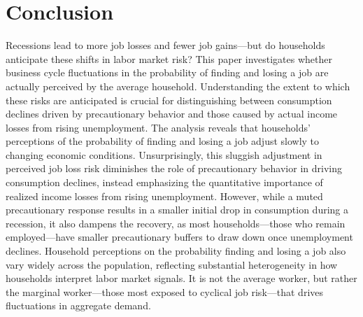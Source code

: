 
\section{Conclusion}

Recessions lead to more job losses and fewer job gains—but do households anticipate these shifts in labor market risk? This paper investigates whether business cycle fluctuations in the probability of finding and losing a job are actually perceived by the average household. Understanding the extent to which these risks are anticipated is crucial for distinguishing between consumption declines driven by precautionary behavior and those caused by actual income losses from rising unemployment. The analysis reveals that households’ perceptions of the probability of finding and losing a job adjust slowly to changing economic conditions. Unsurprisingly, this sluggish adjustment in perceived job loss risk diminishes the role of precautionary behavior in driving consumption declines, instead emphasizing the quantitative importance of realized income losses from rising unemployment. However, while a muted precautionary response results in a smaller initial drop in consumption during a recession, it also dampens the recovery, as most households—those who remain employed—have smaller precautionary buffers to draw down once unemployment declines. Household perceptions on the probability finding and losing a job also vary widely across the population, reflecting substantial heterogeneity in how households interpret labor market signals. It is not the average worker, but rather the marginal worker—those most exposed to cyclical job risk—that drives fluctuations in aggregate demand. 


